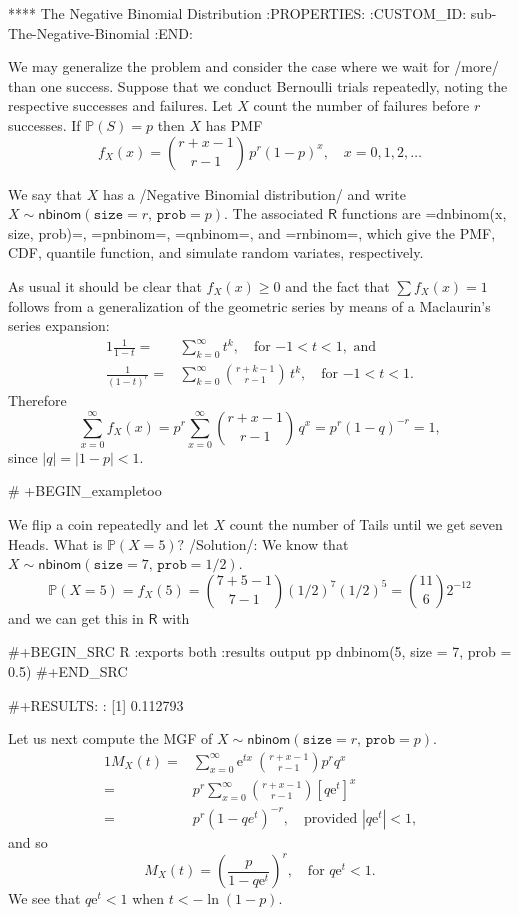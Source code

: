 {**** The Negative Binomial Distribution
:PROPERTIES:
:CUSTOM_ID: sub-The-Negative-Binomial
:END:

We may generalize the problem and consider the case where we wait for
/more/ than one success. Suppose that we conduct Bernoulli trials
repeatedly, noting the respective successes and failures. Let \(X\)
count the number of failures before \(r\) successes. If
\(\mathbb{P}(S)=p\) then \(X\) has PMF
\begin{equation}
f_{X}(x)={r+x-1 \choose r-1}\, p^{r}(1-p)^{x},\quad x=0,1,2,\ldots
\end{equation}

We say that \(X\) has a /Negative Binomial distribution/ and write
\(X\sim\mathsf{nbinom}(\mathtt{size}=r,\,\mathtt{prob}=p)\). The
associated \(\mathsf{R}\) functions are =dnbinom(x, size, prob)=,
=pnbinom=, =qnbinom=, and =rnbinom=, which give the PMF, CDF, quantile
function, and simulate random variates, respectively.

As usual it should be clear that \(f_{X}(x)\geq 0\) and the fact that
\(\sum f_{X}(x)=1\) follows from a generalization of the geometric
series by means of a Maclaurin's series expansion:
\begin{alignat}{1}
\frac{1}{1-t}= & \sum_{k=0}^{\infty}t^{k},\quad \mbox{for \(-1 < t < 1\)},\mbox{ and}\\
\frac{1}{(1-t)^{r}}= & \sum_{k=0}^{\infty}{r+k-1 \choose r-1}\, t^{k},\quad \mbox{for \(-1 < t < 1\)}.
\end{alignat}
Therefore
\begin{equation}
\sum_{x=0}^{\infty}f_{X}(x)=p^{r}\sum_{x=0}^{\infty}{r+x-1 \choose r-1}\, q^{x}=p^{r}(1-q)^{-r}=1,
\end{equation}
since \(|q|=|1-p|<1\). 

# +BEGIN_exampletoo

We flip a coin repeatedly and let \(X\) count the number of Tails
until we get seven Heads. What is \(\mathbb{P}(X=5)?\) /Solution/: We
know that
\(X\sim\mathsf{nbinom}(\mathtt{size}=7,\,\mathtt{prob}=1/2)\).  
\[
\mathbb{P}(X=5)=f_{X}(5)={7+5-1 \choose 7-1}(1/2)^{7}(1/2)^{5}={11
\choose 6}2^{-12} 
\]
and we can get this in \(\mathsf{R}\) with

#+BEGIN_SRC R :exports both :results output pp  
dnbinom(5, size = 7, prob = 0.5)
#+END_SRC

#+RESULTS:
: [1] 0.112793

Let us next compute the MGF of
\(X\sim\mathsf{nbinom}(\mathtt{size}=r,\,\mathtt{prob}=p)\).
\begin{alignat*}{1}
M_{X}(t)= & \sum_{x=0}^{\infty}\mathrm{e}^{tx}\ {r+x-1 \choose r-1}p^{r}q^{x}\\
= & p^{r}\sum_{x=0}^{\infty}{r+x-1 \choose r-1}[q\mathrm{e}^{t}]^{x}\\
= & p^{r}(1-qe^{t})^{-r},\quad \mbox{provided $|q\mathrm{e}^{t}|<1$,}
\end{alignat*}
and so
\begin{equation}
M_{X}(t)=\left(\frac{p}{1-q\mathrm{e}^{t}}\right)^{r},\quad \mbox{for $q\mathrm{e}^{t}<1$}.
\end{equation}
We see that \(q\mathrm{e}^{t}<1\) when \(t<-\ln(1-p)\).

}
